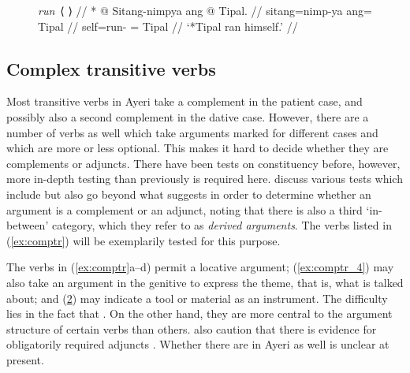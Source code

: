\begin{figure}
\ex\label{ex:runtranswrong}\begingl
	\glpreamble *\emph{run}~⟨\ups{\Subj} \ups{\Obj}⟩ //
	\gla \textup{*} @ Sitang-nimpya ang @ Tipal. //
	\glb {} sitang=nimp-ya ang= Tipal //
	\glc {} self=run-\TsgM{} \Aarg{}= Tipal //
	\glft \hphantom{*}`*Tipal ran himself.' //
\endgl\xe
\end{figure}


\subsection{Complex transitive verbs}
\label{subsec:comptr}

Most transitive verbs in Ayeri take a complement in the patient case, and
possibly also a second complement in the dative case. However, there are a
number of verbs as well which take arguments marked for different cases and
which are more or less optional. This makes it hard to decide whether they are
complements or adjuncts. There have been tests on constituency before, however,
more in-depth testing than previously is required here.
\citet{needhamtoivonen2011} discuss various tests which include but also go
beyond what \citet{carnie2013} suggests in order to determine whether an
argument is a complement or an adjunct, noting that there is also a third
`in-between' category, which they refer to as \emph{derived arguments}. The
verbs listed in (\ref{ex:comptr}) will be exemplarily tested for this purpose.

\begin{figure}[h]
\pex\label{ex:comptr}
\a\label{ex:comptr_1}%
\a\label{ex:comptr_2}%
\a\label{ex:comptr_3}%
\a\label{ex:comptr_4}%
\a\label{ex:comptr_5}%
\xe
\end{figure}

The verbs in (\ref{ex:comptr}a--d) permit a locative argument;
(\ref{ex:comptr_4}) may also take an argument in the genitive to express the
theme, that is, what is talked about; and (\ref{ex:comptr_5}) may indicate a
tool or material as an instrument. The difficulty lies in the fact that
. On the other hand, they are more central to the argument structure of
certain verbs than others. \citet{needhamtoivonen2011} also caution that there
is evidence for obligatorily required adjuncts
\citep[406]{needhamtoivonen2011}. Whether there are in Ayeri as well is unclear
at present.

